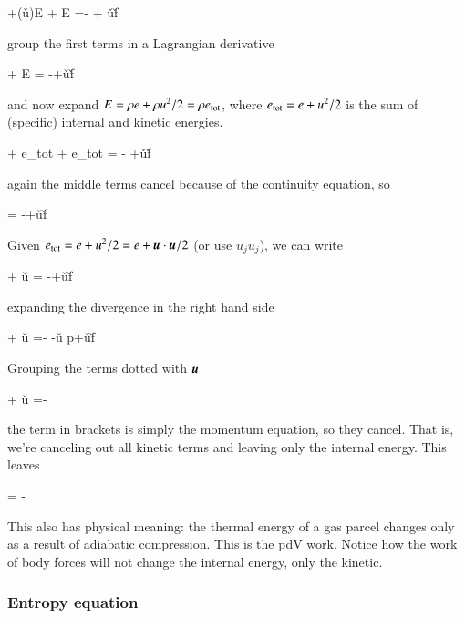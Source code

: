\beq
{} +(\v{u}\cdot\grad)E + E  =- + \rho\v{u}\cdot \v{f}
\eeq

\noindent group the first terms in a Lagrangian derivative

\beq
{} + E  = -+\rho\v{u}\cdot \v{f}
\eeq

\noindent and now expand $E=\rho e + \rho u^2/2  = \rho e_{\rm tot}$, where $ e_{\rm
  tot}=e + u^2/2$ is the sum of (specific) internal and kinetic
energies. 

\beq
\rho{} + e_{\rm tot} + e_{\rm tot}\rho{}  = - +\rho\v{u}\cdot \v{f}
\eeq

\noindent again the middle terms cancel because of the continuity equation, so 

\beq
{}  = -+\v{u}\cdot \v{f}
\eeq

Given $ e_{\rm  tot}=e + u^2/2 = e + {\boldsymbol{u}}\cdot{\boldsymbol{u}}/2$ (or use $u_ju_j$), we can write 

\beq
{} + \v{u} \cdot{} = -+\rho\v{u}\cdot \v{f}
\eeq

\noindent expanding the divergence in the right hand side 

\beq
{} + \v{u} \cdot{} =- -\v{u} \cdot \grad p+\rho\v{u}\cdot \v{f}
\eeq

Grouping the terms dotted with ${\boldsymbol{u}}$ 

\beq
{} + \v{u} \cdot {}=- 
\eeq

\noindent the term in brackets is simply the momentum equation, so they
cancel. That is, we're canceling out all kinetic terms and leaving
only the internal energy. This leaves


\beq
{} = - 
\eeq

This also has physical meaning: the thermal energy of a gas parcel changes only as a result of
adiabatic compression. This is the pdV work. Notice how the work of body forces
will not change the internal energy, only the kinetic. 

\subsubsection{Entropy equation}


